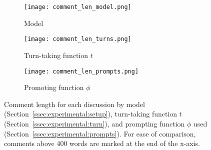 \begin{figure*}[t]
    \begin{subfigure}{0.32\linewidth}
        \texttt{[image: comment\_len\_model.png]}
        \caption{Model}
        \label{fig:comment_length_model}
    \end{subfigure}%
    \hfill
    \begin{subfigure}{0.32\linewidth}
        \texttt{[image: comment\_len\_turns.png]}
        \caption{Turn-taking function $t$}
        \label{fig:comment_length_turns}
    \end{subfigure}%
    \hfill
    \begin{subfigure}{0.32\linewidth}
        \texttt{[image: comment\_len\_prompts.png]}
        \caption{Promoting function $\phi$}
        \label{fig:comment_length_prompts}
    \end{subfigure}%

    \caption{Comment length for each discussion by model (Section~\ref{ssec:experimental:setup}), turn-taking function $t$ (Section~\ref{ssec:experimental:turn}), and prompting function $\phi$ used (Section~\ref{ssec:experimental:prompts}). For ease of comparison, comments above 400 words are marked at the end of the x-axis.}
    \label{fig:comment_length}
\end{figure*}
